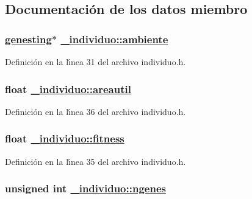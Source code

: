 \subsection{Documentaci\'{o}n de los datos miembro}
\hypertarget{struct__individuo_77db4f35b317761eeb9a0cb2b8f8276d_77db4f35b317761eeb9a0cb2b8f8276d}{
\subsubsection[ambiente]{\setlength{\rightskip}{0pt plus 5cm}\hyperlink{struct__genesting}{genesting}$\ast$ \hyperlink{struct__individuo_77db4f35b317761eeb9a0cb2b8f8276d_77db4f35b317761eeb9a0cb2b8f8276d}{\_\-individuo::ambiente}}}
\label{struct__individuo_77db4f35b317761eeb9a0cb2b8f8276d_77db4f35b317761eeb9a0cb2b8f8276d}




Definici\'{o}n en la l\'{\i}nea 31 del archivo individuo.h.\hypertarget{struct__individuo_81afc3d6d6f5394611dcd09a418ee828_81afc3d6d6f5394611dcd09a418ee828}{
\subsubsection[areautil]{\setlength{\rightskip}{0pt plus 5cm}float \hyperlink{struct__individuo_81afc3d6d6f5394611dcd09a418ee828_81afc3d6d6f5394611dcd09a418ee828}{\_\-individuo::areautil}}}
\label{struct__individuo_81afc3d6d6f5394611dcd09a418ee828_81afc3d6d6f5394611dcd09a418ee828}




Definici\'{o}n en la l\'{\i}nea 36 del archivo individuo.h.\hypertarget{struct__individuo_afa717374da03fa5ef2c5ac8c08e1daa_afa717374da03fa5ef2c5ac8c08e1daa}{
\subsubsection[fitness]{\setlength{\rightskip}{0pt plus 5cm}float \hyperlink{struct__individuo_afa717374da03fa5ef2c5ac8c08e1daa_afa717374da03fa5ef2c5ac8c08e1daa}{\_\-individuo::fitness}}}
\label{struct__individuo_afa717374da03fa5ef2c5ac8c08e1daa_afa717374da03fa5ef2c5ac8c08e1daa}




Definici\'{o}n en la l\'{\i}nea 35 del archivo individuo.h.\hypertarget{struct__individuo_6ca41cfab8bba8bd7c2ba8f44d2407f1_6ca41cfab8bba8bd7c2ba8f44d2407f1}{
\subsubsection[ngenes]{\setlength{\rightskip}{0pt plus 5cm}unsigned int \hyperlink{struct__individuo_6ca41cfab8bba8bd7c2ba8f44d2407f1_6ca41cfab8bba8bd7c2ba8f44d2407f1}{\_\-individuo::ngenes}}}
\label{struct__individuo_6ca41cfab8bba8bd7c2ba8f44d2407f1_6ca41cfab8bba8bd7c2ba8f44d2407f1}




